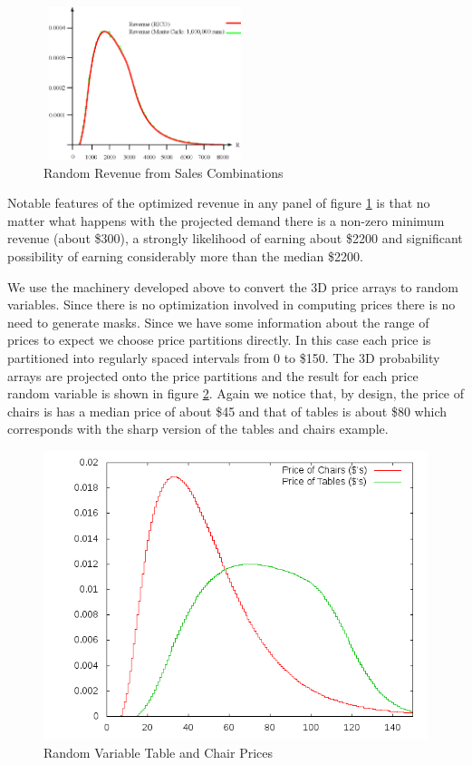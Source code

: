 \begin{figure}[ht]
\begin{minipage}[b]{0.5\linewidth}
\centering
\includegraphics[width=2.33in, height=1.75in]{Images/ABC_1M}
\end{minipage}
  \caption[Random Revenue from Sales Combinations]
          {Random Revenue from Sales Combinations}
  \label{fig:ABC_4}
\end{figure}



Notable features of the optimized revenue in any panel of figure \ref{fig:ABC_4} is
that no matter what happens with the projected demand there is a
non-zero minimum revenue (about \$300), a strongly likelihood of
earning about \$2200 and significant possibility of earning
considerably more than the median \$2200.

We use the machinery developed above to convert the 3D price arrays to
random variables. Since there is no optimization involved in computing
prices there is no need to generate masks. Since we have some
information about the range of prices to expect we choose price
partitions directly. In this case each price is partitioned into
regularly spaced intervals from 0 to \$150. The
3D probability arrays are projected onto the price partitions and the
result for each price random variable is shown in figure
\ref{fig:tcd_prices}. Again we notice that, by design, the price of
chairs is has a median price of about \$45 and that of tables is about
\$80 which corresponds with the sharp version of the tables and chairs
example. 

\begin{figure}
  \centering
  \includegraphics[width=120mm]{Images/tcd_prices}
  \caption[Random Variable Table and Chair Prices]
          {Random Variable Table and Chair Prices}
  \label{fig:tcd_prices}
\end{figure}


